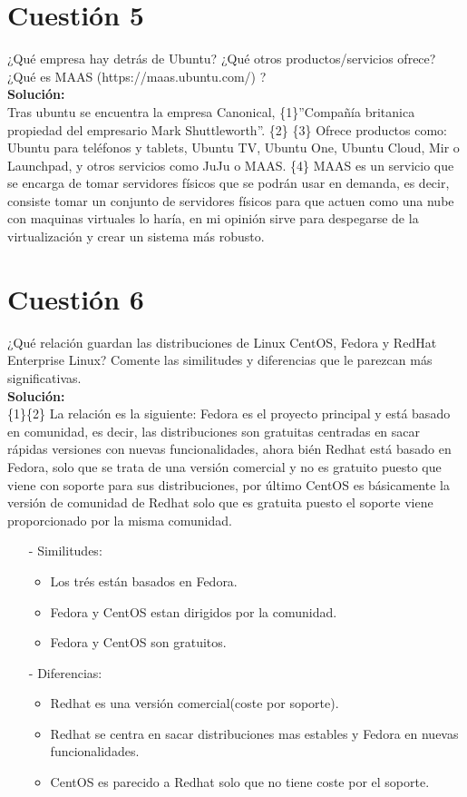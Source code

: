 \documentclass[a4paper, 11pt]{article} %
\begin{document}
\section{Cuestión 5}
¿Qué empresa hay detrás de Ubuntu? ¿Qué otros productos/servicios ofrece? ¿Qué es MAAS (https://maas.ubuntu.com/) ?\\
\textbf{Solución:}\\
Tras ubuntu se encuentra la empresa Canonical, \{1\}''Compañía britanica propiedad del empresario Mark Shuttleworth''. \{2\} \{3\} Ofrece productos como: Ubuntu para teléfonos y tablets, Ubuntu TV, Ubuntu One, Ubuntu Cloud, Mir o Launchpad, y otros servicios como JuJu o MAAS. \{4\} MAAS es un servicio que se encarga de tomar servidores físicos que se podrán usar en demanda, es decir, consiste tomar un conjunto de servidores físicos para que actuen como una nube con maquinas virtuales lo haría, en mi opinión sirve para despegarse de la virtualización y crear un sistema más robusto.
\section{Cuestión 6}
¿Qué relación guardan las distribuciones de Linux CentOS, Fedora y RedHat Enterprise Linux? Comente las similitudes y diferencias que le parezcan más significativas.\\
\textbf{Solución:}\\
\{1\}\{2\} La relación es la siguiente: Fedora es el proyecto principal y está basado en comunidad, es decir, las distribuciones son gratuitas centradas en sacar rápidas versiones con nuevas funcionalidades, ahora bién Redhat está basado en Fedora, solo que se trata de una versión comercial y no es gratuito puesto que viene con soporte para sus distribuciones, por último CentOS es básicamente la versión de comunidad de Redhat solo que es gratuita puesto el soporte viene proporcionado por la misma comunidad.

\begin{itemize}
\item[-]Similitudes:
	\begin{itemize}
	\item Los trés están basados en Fedora.
	\item Fedora y CentOS estan dirigidos por la comunidad.
	\item Fedora y CentOS son gratuitos.
	\end{itemize}
\item[-]Diferencias:
	\begin{itemize}
	\item Redhat es una versión comercial(coste por soporte).
	\item Redhat se centra en sacar distribuciones mas estables y Fedora en nuevas funcionalidades.
	\item CentOS es parecido a Redhat solo que no tiene coste por el soporte.
	\end{itemize}
\end{itemize} 
\end{document}
